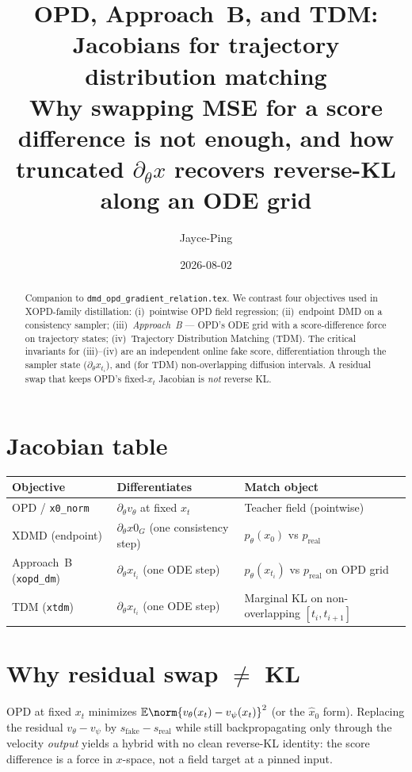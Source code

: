 \documentclass[11pt,a4paper]{article}
\title{\textbf{OPD, Approach~B, and TDM: Jacobians for trajectory distribution matching}\\[0.3em]
\large Why swapping MSE for a score difference is not enough, and how truncated
$\partial_\theta x$ recovers reverse-KL along an ODE grid}
\author{Jayce-Ping}
\date{2026-08-02}
\newcommand{\E}{\mathbb{E}}
\newcommand{\xh}{\hat{x}_0}
\newcommand{\real}{\mathrm{real}}
\newcommand{\fake}{\mathrm{fake}}
\begin{document}
\maketitle

\begin{abstract}
Companion to \texttt{dmd\_opd\_gradient\_relation.tex}. We contrast four objectives used
in XOPD-family distillation: (i)~pointwise OPD field regression; (ii)~endpoint DMD on a
consistency sampler; (iii)~\emph{Approach~B} --- OPD's ODE grid with a score-difference
force on trajectory states; (iv)~Trajectory Distribution Matching (TDM). The critical
invariants for (iii)--(iv) are an independent online fake score, differentiation through
the sampler state ($\partial_\theta x_{t_i}$), and (for TDM) non-overlapping diffusion
intervals. A residual swap that keeps OPD's fixed-$x_t$ Jacobian is \emph{not} reverse KL.
\end{abstract}

\section{Jacobian table}

\begin{center}
\small
\begin{tabular}{@{}llp{5.2cm}@{}}
\toprule
Objective & Differentiates & Match object \\
\midrule
OPD / \texttt{x0\_norm} & $\partial_\theta v_\theta$ at fixed $x_t$ & Teacher field (pointwise) \\
XDMD (endpoint) & $\partial_\theta x0_G$ (one consistency step) & $p_\theta(x_0)$ vs $p_{\real}$ \\
Approach~B (\texttt{xopd\_dm}) & $\partial_\theta x_{t_i}$ (one ODE step) & $p_\theta(x_{t_i})$ vs $p_{\real}$ on OPD grid \\
TDM (\texttt{xtdm}) & $\partial_\theta x_{t_i}$ (one ODE step) & Marginal KL on non-overlapping $[t_i,t_{i+1}]$ \\
\bottomrule
\end{tabular}
\end{center}

\section{Why residual swap $\neq$ KL}

OPD at fixed $x_t$ minimizes $\E\norm{v_\theta(x_t)-v_\psi(x_t)}^2$ (or the $\xh$ form).
Replacing the residual $v_\theta-v_\psi$ by $s_{\fake}-s_{\real}$ while still backpropagating
only through the velocity \emph{output} yields a hybrid with no clean reverse-KL identity:
the score difference is a force in $x$-space, not a field target at a pinned input.
\end{document}
